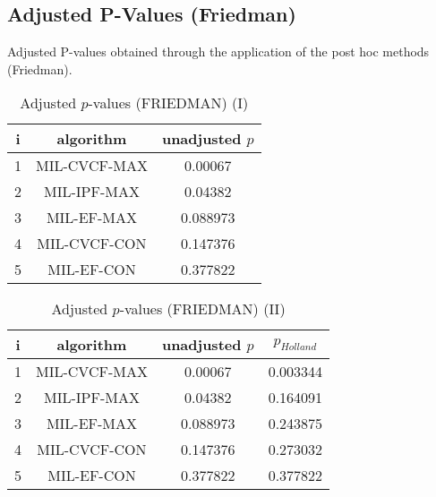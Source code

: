 \documentclass[a4paper,10pt]{article}
\begin{document}
\begin{landscape}
\newpage

\section{Adjusted P-Values (Friedman)}


Adjusted P-values obtained through the application of the post hoc methods (Friedman).

\begin{table}[!htp]
\centering\small
\begin{tabular}{ccc}
i&algorithm&unadjusted $p$\\
\hline1&MIL-CVCF-MAX&0.00067\\2&MIL-IPF-MAX&0.04382\\3&MIL-EF-MAX&0.088973\\4&MIL-CVCF-CON&0.147376\\5&MIL-EF-CON&0.377822\\\hline
\end{tabular}
\caption{Adjusted $p$-values (FRIEDMAN) (I)}
\end{table}
\begin{table}[!htp]
\centering\small
\begin{tabular}{cccc}
i&algorithm&unadjusted $p$&$p_{Holland}$\\
\hline1&MIL-CVCF-MAX&0.00067&0.003344\\2&MIL-IPF-MAX&0.04382&0.164091\\3&MIL-EF-MAX&0.088973&0.243875\\4&MIL-CVCF-CON&0.147376&0.273032\\5&MIL-EF-CON&0.377822&0.377822\\\hline
\end{tabular}
\caption{Adjusted $p$-values (FRIEDMAN) (II)}
\end{table}

\newpage
\end{landscape}
\end{document}
